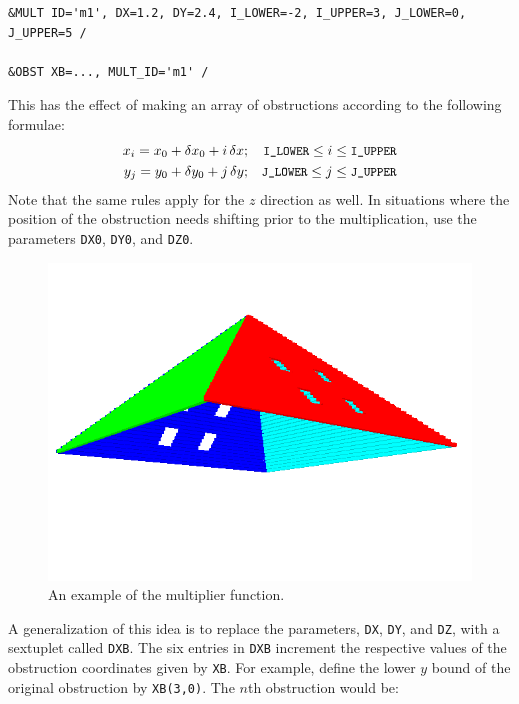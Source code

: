 \documentclass[11pt]{book}
\newcommand{\ct}{\tt\small}
\newcommand{\dx}{\delta x}
\newcommand{\dy}{\delta y}
\begin{document}
\footnotesize
\begin{verbatim}
&MULT ID='m1', DX=1.2, DY=2.4, I_LOWER=-2, I_UPPER=3, J_LOWER=0, J_UPPER=5 /

&OBST XB=..., MULT_ID='m1' /
\end{verbatim}
\normalsize

\noindent
This has the effect of making an array of obstructions according to the following formulae:
\begin{eqnarray*}  x_i = x_0 + \dx_0 + i \, \dx  &;& \hbox{\ct I\_LOWER} \le i \le \hbox{\ct I\_UPPER} \\
                   y_j = y_0 + \dy_0 + j \, \dy  &;& \hbox{\ct J\_LOWER} \le j \le \hbox{\ct J\_UPPER}
\end{eqnarray*}
Note that the same rules apply for the $z$ direction as well. In situations where the position of the obstruction needs shifting prior to the multiplication, use the
parameters {\ct DX0}, {\ct DY0}, and {\ct DZ0}.

\begin{figure}[t]
\includegraphics[width=\textwidth]{SCRIPT_FIGURES/pyramid}
\caption[An example of the multiplier function]{An example of the multiplier function.}
\label{fig:mult}
\end{figure}

A generalization of this idea is to replace the parameters, {\ct DX}, {\ct DY}, and {\ct DZ}, with a sextuplet called {\ct DXB}.
The six entries in {\ct DXB} increment the respective values of the obstruction coordinates given by {\ct XB}. For example,
define the lower $y$ bound of the original obstruction by {\ct XB(3,0)}. The $n$th obstruction would be:
\end{document}

